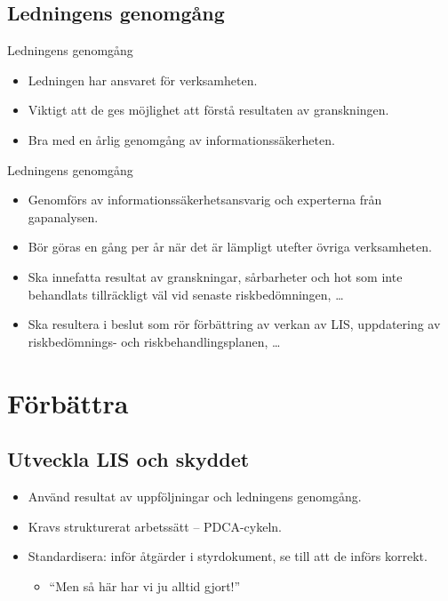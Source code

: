 \documentclass{beamer}
\begin{document}
\subsection{Ledningens genomgång}
\begin{frame}{Ledningens genomgång}
  \begin{itemize}
    \item Ledningen har ansvaret för verksamheten.
    \item Viktigt att de ges möjlighet att förstå resultaten av granskningen.
    \item Bra med en årlig genomgång av informationssäkerheten.
  \end{itemize}
\end{frame}
\begin{frame}{Ledningens genomgång}
  \begin{itemize}
    \item Genomförs av informationssäkerhetsansvarig och experterna från 
      gapanalysen.
    \item Bör göras en gång per år när det är lämpligt utefter övriga 
      verksamheten.
  \end{itemize}
\end{frame}
\begin{frame}{\insertsubsectionhead}
  \begin{itemize}
    \item Ska innefatta resultat av granskningar, sårbarheter och hot som inte 
      behandlats tillräckligt väl vid senaste riskbedömningen, \dots
    \item Ska resultera i beslut som rör förbättring av verkan av LIS, 
      uppdatering av riskbedömnings- och riskbehandlingsplanen, \dots
  \end{itemize}
\end{frame}


\section{Förbättra}

\subsection{Utveckla LIS och skyddet}
\begin{frame}{\insertsubsectionhead}
  \begin{itemize}
    \item Använd resultat av uppföljningar och ledningens genomgång.
    \item Kravs strukturerat arbetssätt -- PDCA-cykeln.
    \item Standardisera: inför åtgärder i styrdokument, se till att de införs 
      korrekt.
      \begin{itemize}
        \item \enquote{Men så här har vi ju alltid gjort!}
      \end{itemize}
  \end{itemize}
\end{frame}
\end{document}
